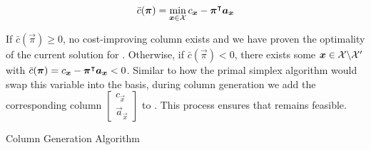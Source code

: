 \begin{equation}
\bar{c}(\vec{\pi}) = \underset{\vec{x} \in \indexset{X}}{\min} \, c_\vec{x} - \vec{\pi}\transpose \vec{a}_\vec{x}
\end{equation}

If $\bar{c}(\vec{\pi}) \geq 0$, no cost-improving column exists and we have proven the optimality of the current solution for \MP{}. Otherwise, if $\bar{c}(\vec{\pi}) < 0$, there exists some ${\bm{x}} \in \mathcal{X} \backslash \mathcal{X}'$ with $\bar{c}(\vec{\pi}) = c_\vec{x} - \vec{\pi}\transpose \vec{a}_\vec{x} < 0$. Similar to how the primal simplex algorithm would swap this variable into the basis, during column generation we add the corresponding column $\begin{bmatrix} c_\vec{x} \\ \vec{a}_\vec{x} \end{bmatrix}$ to \RMP{} \cite{thebook}. This process ensures that \RMP{} remains feasible.

\begin{algorithm}
\caption{Column Generation Algorithm}

\end{algorithm}

